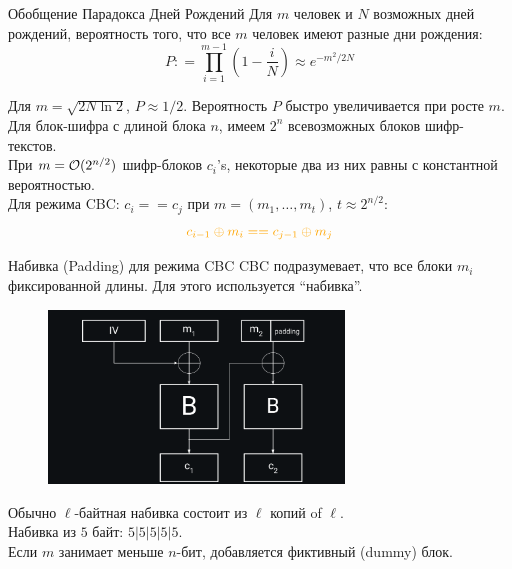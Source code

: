 \documentclass[usenames,dvipsnames,8pt,aspectratio=169]{beamer}
\begin{document}
\begin{frame}{Обобщение Парадокса Дней Рождений}
\Large
Для $m$ человек и $N$ возможных дней рождений, вероятность того, что все $m$ человек имеют разные дни рождения:
\[
	P : = \prod_{i=1}^{m-1} \left(  1  -\frac{i}{N} \right) \approx e^{-m^2/2N}
\]

Для $m = \sqrt{2N \ln 2}$, $P \approx 1/2$.  Вероятность $P$ быстро увеличивается при росте $m$. \\[10pt]

\pause
Для блок-шифра с длиной блока $n$, имеем $2^{n}$ всевозможных блоков шифр-текстов.\\
При {\color{Orange} $m = \mathcal{O}(2^{n/2})$ } шифр-блоков $c_i$'s, некоторые два из них равны с константной вероятностью.\\[15pt]

Для режима CBC: $c_i == c_j$ при $m=(m_1, \ldots, m_t)$, {\color{Orange} $t \approx 2^{n/2}$}:
\Large
\[
{\color{Orange} c_{i-1} \oplus m_{i} == c_{j-1} \oplus m_{j}}
\]

\end{frame}


\begin{frame}{Набивка (Padding) для режима CBC}
\Large
CBC подразумевает, что все блоки $m_i$ фиксированной длины. Для этого используется ``набивка''.
\begin{figure}
	\includegraphics[width=0.70\textwidth]{CBC_Padding}
\end{figure}
Обычно $\ell$-байтная набивка состоит из $\ell$ копий of $\ell$. \\
Набивка из $5$ байт: $5|5|5|5|5$. \\
Если $m$ занимает меньше $n$-бит, добавляется фиктивный (dummy) блок.
\end{frame}
\end{document}
